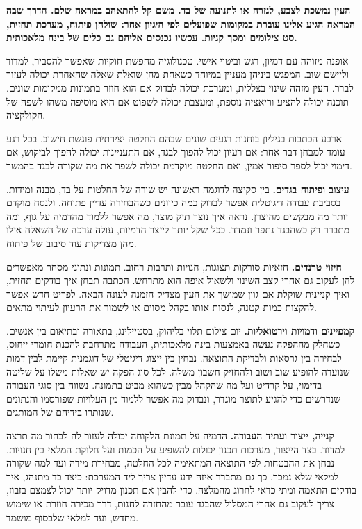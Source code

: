 
{\fontsize{14.2}{20.4}\selectfont\bfseries
העין נמשכת לצבע, לגזרה או לתנועה של בד. משם קל להתאהב במראה שלם. הדרך שבה המראה הגיע אלינו עוברת במקומות שפועלים לפי היגיון אחר: שולחן פיתוח, מערכת תחזית, סט צילומים ומסך קניות. עכשיו נכנסים אליהם גם כלים של בינה מלאכותית.\par}

{\fontsize{13.1}{21.2}\selectfont
אופנה מזוהה עם דמיון, רגש וביטוי אישי. טכנולוגיה מחפשת חוקיות שאפשר להסביר, למדוד וליישם שוב. המפגש ביניהן מעניין במיוחד כשאחת מהן שואלת שאלה שהאחרת יכולה לעזור לברר. העין מזהה שינוי בצללית, ומערכת יכולה לבדוק אם הוא חוזר בתמונות ממקומות שונים. תוכנה יכולה להציע וריאציה נוספת, ומעצבת יכולה לשפוט אם היא מוסיפה משהו לשפה של הקולקציה.

ארבע הכתבות בגיליון בוחנות רגעים שונים שבהם החלטה יצירתית פוגשת חישוב. בכל רגע עומד למבחן דבר אחר: אם רעיון יכול להפוך לבגד, אם התעניינות יכולה להפוך לביקוש, אם דימוי יכול לספר סיפור אמין, ואם החלטה מוקדמת יכולה לשפר את מה שקורה לבגד בהמשך.

\textbf{עיצוב ופיתוח בגדים.} בין סקיצה לדוגמה ראשונה יש שורה של החלטות על בד, מבנה ומידות. בסביבת עבודה דיגיטלית אפשר לבדוק כמה כיוונים כשהבחירה עדיין פתוחה, ולנסח מוקדם יותר מה מבקשים מהיצרן. נראה איך נוצר תיק מוצר, מה אפשר ללמוד מהדמיה על גוף, ומה מתברר רק כשהבגד נתפר ונמדד. ככל שקל יותר לייצר הדמיות, עולה ערכה של השאלה אילו מהן מצדיקות עוד סיבוב של פיתוח.

\textbf{חיזוי טרנדים.} חזאיות סורקות תצוגות, חנויות ותרבות רחוב. תמונות ונתוני מסחר מאפשרים להן לעקוב גם אחרי קצב השינוי ולשאול איפה הוא מתרחש. הכתבה תבחן איך בודקים תחזית, ואיך קניינית שוקלת אם גוון שמושך את העין מצדיק הזמנה לעונה הבאה. לפריט חדש אפשר להקצות כמות קטנה, לנסות אותו בקהל מסוים או לשמור את הרעיון לעיתוי מתאים.

\textbf{קמפיינים ודמויות וירטואליות.} יום צילום תלוי בליהוק, בסטיילינג, בתאורה ובתיאום בין אנשים. כשחלק מההפקה נעשה באמצעות בינה מלאכותית, העבודה מתרחבת להכנת חומרי ייחוס, לבחירה בין גרסאות ולבדיקת התוצאה. נבחין בין ייצוג דיגיטלי של דוגמנית קיימת לבין דמות שנועדה להופיע שוב ושוב ולהחזיק חשבון משלה. לכל סוג הפקה יש שאלות משלו על שליטה בדימוי, על קרדיט ועל מה שהקהל מבין כשהוא מביט בתמונה. נשווה בין סוגי העבודה שנדרשים כדי להגיע לתוצר מוגדר, ונבדוק מה אפשר ללמוד מן העלויות שפורסמו והנתונים שנותרו בידיהם של המותגים.

\textbf{קנייה, ייצור ועתיד העבודה.} הדמיה על תמונת הלקוחה יכולה לעזור לה לבחור מה תרצה למדוד. בצד הייצור, מערכות תכנון יכולות להשפיע על הכמות ועל חלוקת המלאי בין חנויות. נבחן את ההבטחות לפי התוצאה המתאימה לכל החלטה, מבחירת מידה ועד למה שקורה למלאי שלא נמכר. כך גם מתברר איזה ידע עדיין צריך ליד המערכת: כיצד בד מתנהג, איך בודקים התאמה ומתי כדאי לחרוג מהמלצה. כדי להבין אם תכנון מדויק יותר יכול לצמצם בזבוז, צריך לעקוב גם אחרי המסלול שהבגד עובר מהחזרה לחנות, דרך מכירה חוזרת או שימוש מחדש, ועד למלאי שלבסוף מושמד.
\par}
